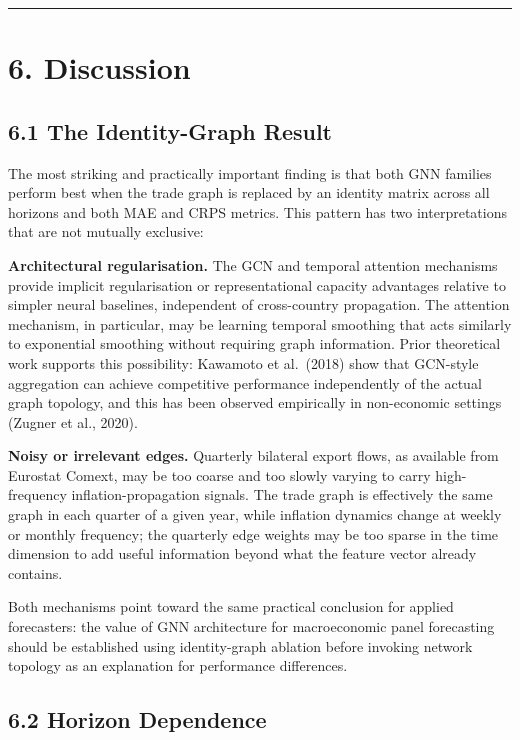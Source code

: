 \documentclass[
  11pt,
  a4paper]{article}
\begin{document}
\begin{center}\rule{0.5\linewidth}{0.5pt}\end{center}

\section{6. Discussion}\label{discussion}

\subsection{6.1 The Identity-Graph
Result}\label{the-identity-graph-result}

The most striking and practically important finding is that both GNN
families perform best when the trade graph is replaced by an identity
matrix across all horizons and both MAE and CRPS metrics. This pattern
has two interpretations that are not mutually exclusive:

\textbf{Architectural regularisation.} The GCN and temporal attention
mechanisms provide implicit regularisation or representational capacity
advantages relative to simpler neural baselines, independent of
cross-country propagation. The attention mechanism, in particular, may
be learning temporal smoothing that acts similarly to exponential
smoothing without requiring graph information. Prior theoretical work
supports this possibility: Kawamoto et al.~(2018) show that GCN-style
aggregation can achieve competitive performance independently of the
actual graph topology, and this has been observed empirically in
non-economic settings (Zugner et al., 2020).

\textbf{Noisy or irrelevant edges.} Quarterly bilateral export flows, as
available from Eurostat Comext, may be too coarse and too slowly varying
to carry high-frequency inflation-propagation signals. The trade graph
is effectively the same graph in each quarter of a given year, while
inflation dynamics change at weekly or monthly frequency; the quarterly
edge weights may be too sparse in the time dimension to add useful
information beyond what the feature vector already contains.

Both mechanisms point toward the same practical conclusion for applied
forecasters: the value of GNN architecture for macroeconomic panel
forecasting should be established using identity-graph ablation before
invoking network topology as an explanation for performance differences.

\subsection{6.2 Horizon Dependence}\label{horizon-dependence}
\end{document}

